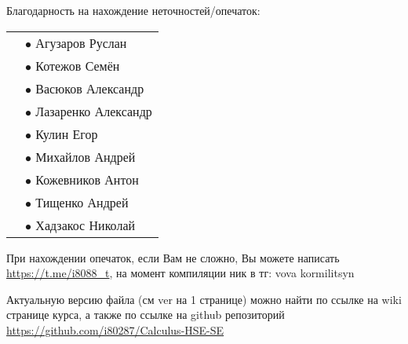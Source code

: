 Благодарность на нахождение неточностей/опечаток:

\begin{tabular}{rl}
    & $\bullet$ Агузаров Руслан \\
    & $\bullet$ Котежов Семён \\
    & $\bullet$ Васюков Александр \\
    & $\bullet$ Лазаренко Александр \\
    & $\bullet$ Кулин Егор \\
    & $\bullet$ Михайлов Андрей \\
    & $\bullet$ Кожевников Антон \\
    & $\bullet$ Тищенко Андрей \\
    & $\bullet$ Хадзакос Николай \\
\end{tabular}

При нахождении опечаток, если Вам не сложно, Вы можете написать \url{https://t.me/i8088_t}, на момент компиляции ник в тг: vova kormilitsyn

Актуальную версию файла (см ver на 1 странице) можно найти по ссылке на wiki странице курса, 
а также по ссылке на github репозиторий \url{https://github.com/i80287/Calculus-HSE-SE}
